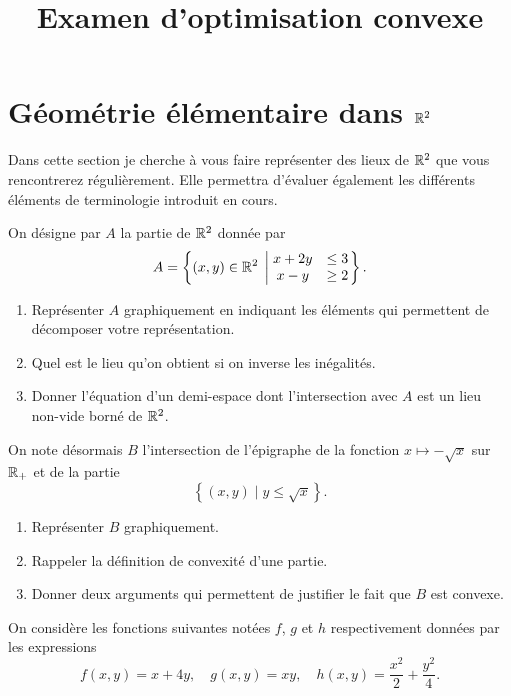 \documentclass[11pt, a4paper]{article}
\title{%
  { \huge Examen d'optimisation convexe}%
}
\author{}
\date{}
\begin{document}
\maketitle\thispagestyle{fancy}

\section{Géométrie élémentaire dans $\mathbb{R}^2$}
\label{sec:geom}

Dans cette section je cherche à vous faire représenter des lieux de
$\mathbb{R}^2$ que vous rencontrerez régulièrement. Elle permettra d'évaluer
également les différents éléments de terminologie introduit en cours.

\noindent On désigne par $A$ la partie de $\mathbb{R}^2$ donnée par
\[
A = \left\{ (x, y) \in \mathbb{R}^2 \; \left| \; \begin{matrix} x + 2y & \leq 3 \\ x - y &
      \geq 2 \end{matrix}\right.\right\}.
\]
\begin{question}{4}
  \begin{enumerate}
  \item
    Représenter $A$ graphiquement en indiquant les éléments qui
    permettent de décomposer votre représentation.
  \item
    Quel est le lieu qu'on obtient si on inverse les inégalités.
  \item
    Donner l'équation d'un demi-espace dont l'intersection avec $A$
    est un lieu non-vide borné de $\mathbb{R}^2$.
  \end{enumerate}
\end{question}
On note désormais $B$ l'intersection de l'épigraphe de la fonction
$x \mapsto -\sqrt{x}$ sur $\mathbb{R}_+$ et de la partie
\[
\left\{(x, y) \mid y \leq \sqrt{x}\right\}.
\]
\begin{question}{4}
  \begin{enumerate}
  \item Représenter $B$ graphiquement.
  \item Rappeler la définition de convexité d'une partie.
  \item Donner deux arguments qui permettent de justifier le fait que
    $B$ est convexe.
  \end{enumerate}
\end{question}
On considère les fonctions suivantes notées $f$, $g$ et $h$
respectivement données par les expressions
\[
  f(x, y) = x + 4y, \quad g(x, y) = xy, \quad h(x, y) = \frac{x^2}{2} + \frac{y^2}{4}.
\]
\end{document}
